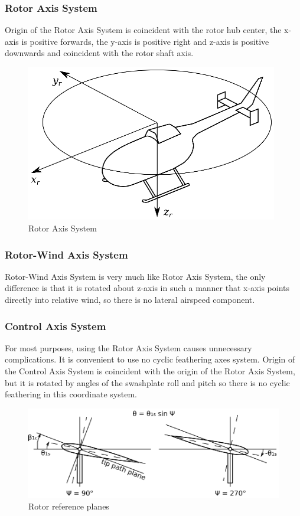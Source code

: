 \subsubsection{Rotor Axis System}

Origin of the Rotor Axis System is coincident with the rotor hub center, the x-axis is positive forwards, the y-axis is positive right and z-axis is positive downwards and coincident with the rotor shaft axis.

\begin{figure}[h!]
  \centering
  \includegraphics[width=110mm]{images/coordinate_system_RAS.eps}
  \caption{Rotor Axis System}
\end{figure}

\subsubsection{Rotor-Wind Axis System}

Rotor-Wind Axis System is very much like Rotor Axis System, the only difference is that it is rotated about z-axis in such a manner that x-axis points directly into relative wind, so there is no lateral airspeed component.

\subsubsection{Control Axis System}

For most purposes, using the Rotor Axis System causes unnecessary complications. It is convenient to use no cyclic feathering axes system. \cite{GessowMyers1985} Origin of the Control Axis System is coincident with the origin of the Rotor Axis System, but it is rotated by angles of the swashplate roll and pitch so there is no cyclic feathering in this coordinate system.

\begin{figure}[h!]
  \centering
  \includegraphics[width=120mm]{images/rotor_planes.eps}
  \caption{Rotor reference planes}
\end{figure}

